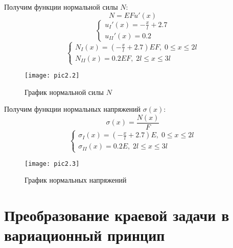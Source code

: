 Получим функции нормальной силы $N$:
\begin{equation}
    \label{eq2.14}
    N = EFu'(x)
\end{equation}
\begin{equation}
    \label{eq2.15}
    \begin{cases}
        \displaystyle u_{I}'(x) = - \frac{x}{l} + 2.7
        \\
        \displaystyle u_{II}'(x) = 0.2
    \end{cases}
\end{equation}
\begin{equation}
    \label{eq2.16}
    \begin{cases}
        \displaystyle N_{I}(x) = (- \frac{x}{l} + 2.7) EF, \; 0 \leq x \leq 2l
        \\
        N_{II}(x) = 0.2EF, \; 2l \leq x \leq 3l
    \end{cases}
\end{equation}
\begin{figure}[H]
    \begin{center}
        \texttt{[image: pic2.2]}
        \caption{График нормальной силы $N$}
        \label{pic2.2}
    \end{center}
\end{figure}

Получим функции нормальных напряжений $\sigma (x)$:
\begin{equation}
    \label{eq2.17}
    \sigma (x) = \frac{N(x)}{F}
\end{equation}
\begin{equation}
    \label{eq2.18}
    \begin{cases}
        \displaystyle \sigma_{I} (x) = (- \frac{x}{l} + 2.7) E, \; 0 \leq x \leq 2l
        \\
        \displaystyle \sigma_{II} (x) = 0.2E, \; 2l \leq x \leq 3l
    \end{cases}
\end{equation}
\begin{figure}[H]
    \begin{center}
        \texttt{[image: pic2.3]}
        \caption{График нормальных напряжений}
        \label{pic2.3}
    \end{center}
\end{figure}

\section{Преобразование краевой задачи в вариационный принцип}

